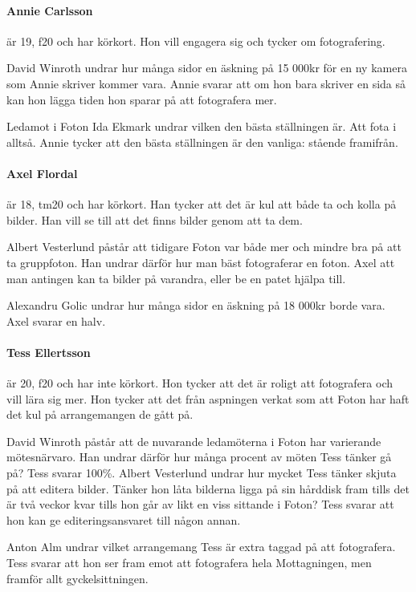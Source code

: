 \documentclass[hidelinks]{sektionsmote}
\begin{document}
\paragraph{Annie Carlsson} är 19, f20 och har körkort.
Hon vill engagera sig och tycker om fotografering.

David Winroth undrar hur många sidor en äskning på 15 000kr för en ny kamera som Annie skriver kommer vara.
Annie svarar att om hon bara skriver en sida så kan hon lägga tiden hon sparar på att fotografera mer.

Ledamot i Foton Ida Ekmark undrar vilken den bästa ställningen är.
Att fota i alltså.
Annie tycker att den bästa ställningen är den vanliga: stående framifrån.

\paragraph{Axel Flordal} är 18, tm20 och har körkort.
Han tycker att det är kul att både ta och kolla på bilder.
Han vill se till att det finns bilder genom att ta dem.

Albert Vesterlund påstår att tidigare Foton var både mer och mindre bra på att ta gruppfoton.
Han undrar därför hur man bäst fotograferar en foton.
Axel att man antingen kan ta bilder på varandra, eller be en patet hjälpa till.

Alexandru Golic undrar hur många sidor en äskning på 18 000kr borde vara.
Axel svarar en halv.

\paragraph{Tess Ellertsson} är 20, f20 och har inte körkort.
Hon tycker att det är roligt att fotografera och vill lära sig mer.
Hon tycker att det från aspningen verkat som att Foton har haft det kul på arrangemangen de gått på.

David Winroth påstår att de nuvarande ledamöterna i Foton har varierande mötesnärvaro.
Han undrar därför hur många procent av möten Tess tänker gå på?
Tess svarar 100\%.
Albert Vesterlund undrar hur mycket Tess tänker skjuta på att editera bilder.
Tänker hon låta bilderna ligga på sin hårddisk fram tills det är två veckor kvar tills hon går av likt en viss sittande i Foton?
Tess svarar att hon kan ge editeringsansvaret till någon annan.

Anton Alm undrar vilket arrangemang Tess är extra taggad på att fotografera.
Tess svarar att hon ser fram emot att fotografera hela Mottagningen, men framför allt gyckelsittningen.
\end{document}
